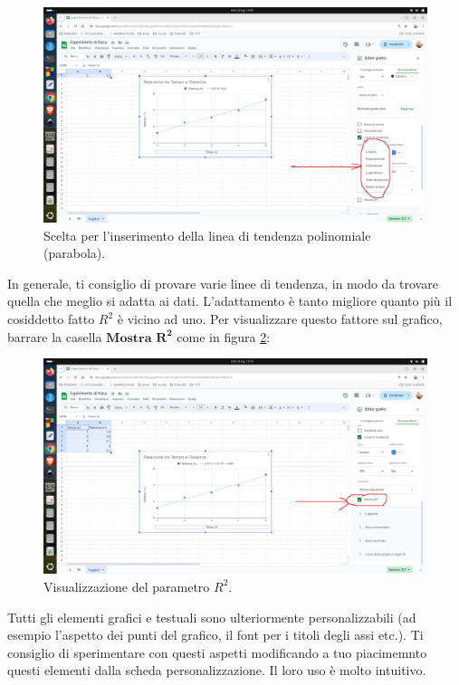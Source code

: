 \documentclass[12pt,a4paper,oneside]{book}
\theoremstyle{esercizio}
\begin{document}
\begin{enumerate}
\begin{figure}[h!]
    \centering
    \includegraphics[width=\linewidth]{img/polinomiale.png} 
    \caption{Scelta per l'inserimento della linea di tendenza polinomiale (parabola).}
    \label{fig:polinomiale}
\end{figure}     
 In generale, ti consiglio di provare varie linee di tendenza, in modo da trovare quella che meglio si adatta ai dati.    L'adattamento è tanto migliore quanto più il cosiddetto fatto $R^2$ è vicino ad uno. Per visualizzare questo fattore sul grafico, barrare la casella $\mathbf{Mostra \,\,R^2}$ come in figura \ref{fig:r2}:
 
   \begin{figure}[h!]
    \centering
    \includegraphics[width=\linewidth]{img/r2.png} 
    \caption{Visualizzazione del parametro $R^2$.}
    \label{fig:r2}
 \end{figure}
 
    
\end{enumerate}
Tutti gli elementi grafici e  testuali sono ulteriormente personalizzabili (ad esempio l'aspetto dei punti del grafico, il font per i titoli degli assi etc.). Ti consiglio di sperimentare con questi aspetti modificando a tuo piacimemnto questi elementi dalla scheda personalizzazione. Il loro uso è molto intuitivo.
\end{document}

